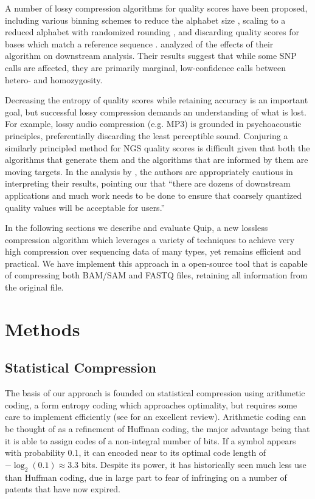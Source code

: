 \documentclass[a4,center,fleqn]{NAR}
\begin{document}
A number of lossy compression algorithms for quality scores have been
proposed, including various binning schemes to reduce the alphabet size
\citep{Wan2011, Hach2012}, scaling to a reduced alphabet with randomized
rounding \citep{Kozanitis2011}, and discarding quality scores for bases which
match a reference sequence \citep{Hsi-YangFritz2011}. \citet{Kozanitis2011}
analyzed of the effects of their algorithm on downstream analysis. Their
results suggest that while some SNP calls are affected, they are primarily
marginal, low-confidence calls between hetero- and homozygosity.

Decreasing the entropy of quality scores while retaining accuracy is an
important goal, but successful lossy compression demands an understanding of
what is lost. For example, lossy audio compression (e.g. MP3) is grounded in
psychoacoustic principles, preferentially discarding the least perceptible
sound. Conjuring a similarly principled method for NGS quality scores is
difficult given that both the algorithms that generate them and the algorithms
that are informed by them are moving targets. In the analysis by
\citet{Kozanitis2011}, the authors are appropriately cautious in interpreting
their results, pointing our that ``there are dozens of downstream applications
and much work needs to be done to ensure that coarsely quantized quality
values will be acceptable for users.''



In the following sections we describe and evaluate Quip, a new lossless
compression algorithm which leverages a variety of techniques to achieve very
high compression over sequencing data of many types, yet remains efficient and
practical. We have implement this approach in a open-source tool that is
capable of compressing both BAM/SAM and FASTQ files, retaining all information
from the original file.


\section{Methods}

\subsection{Statistical Compression}

The basis of our approach is founded on statistical compression using
arithmetic coding, a form entropy coding which approaches optimality, but
requires some care to implement efficiently (see \citet{Said2004} for an
excellent review). Arithmetic coding can be thought of as a refinement of
Huffman coding, the major advantage being that it is able to assign codes of a
non-integral number of bits. If a symbol appears with probability 0.1, it can
encoded near to its optimal code length of $-\log_2(0.1) \approx 3.3$ bits.
Despite its power, it has historically seen much less use than Huffman coding,
due in large part to fear of infringing on a number of patents that have now
expired.
\end{document}
